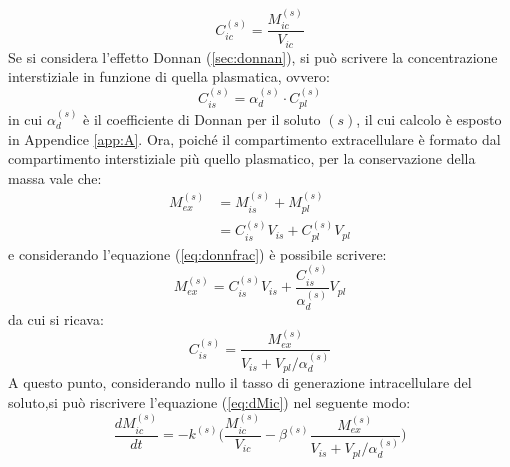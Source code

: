 \begin{equation}\label{eq:ovvia}
	C_{ic}^{(s)} = \frac{M_{ic}^{(s)}}{V_{ic}}
\end{equation}
Se si considera l'effetto Donnan (\textsection\ref{sec:donnan}), si può scrivere la concentrazione interstiziale in funzione di quella plasmatica, ovvero:
\begin{equation}
	C_{is}^{(s)} = \alpha_d^{(s)}\cdot C_{pl}^{(s)}
	\label{eq:donnfrac}
\end{equation}
in cui $\alpha_d^{(s)}$ è il coefficiente di Donnan per il soluto $(s)$, il cui calcolo è esposto in Appendice \ref{app:A}.
Ora, poiché il compartimento extracellulare è formato dal compartimento interstiziale più quello plasmatico, per la conservazione della massa vale che:
\begin{align*}
	M_{ex}^{(s)} &= M_{is}^{(s)} + M_{pl}^{(s)} \\
	             &= C_{is}^{(s)} V_{is} + C_{pl}^{(s)} V_{pl}
\end{align*}
e considerando l'equazione (\ref{eq:donnfrac}) è possibile scrivere:
\begin{equation}\label{eq:meno_ovvia}
	M_{ex}^{(s)} = C_{is}^{(s)} V_{is} + \frac{C_{is}^{(s)}}{\alpha_d^{(s)}} V_{pl}
\end{equation}
da cui si ricava:
\begin{equation*}
	C_{is}^{(s)} = \frac{M_{ex}^{(s)}}{V_{is} + V_{pl}/\alpha_d^{(s)}}
\end{equation*}
A questo punto, considerando nullo il tasso di generazione intracellulare del soluto,si può riscrivere l'equazione (\ref{eq:dMic}) nel seguente modo:
\begin{equation}
	\frac{dM_{ic}^{(s)}}{dt} = - k^{(s)} \biggl(\frac{M_{ic}^{(s)}}{V_{ic}} - \beta^{(s)} \frac{M_{ex}^{(s)}}{V_{is} + V_{pl}/\alpha_d^{(s)}}\biggr)
\end{equation}

